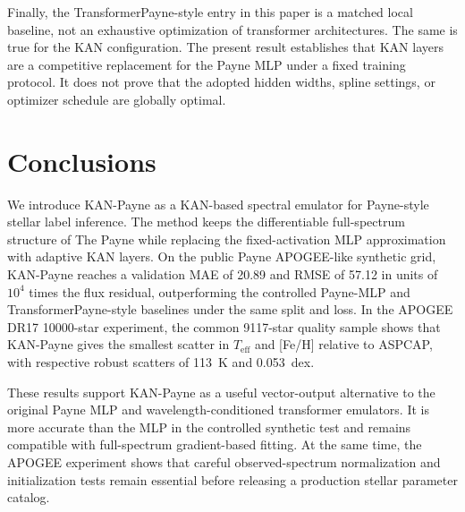 \documentclass[universe,article,submit,pdftex,moreauthors]{Definitions/mdpi}
\begin{document}
Finally, the TransformerPayne-style entry in this paper is a matched local baseline,
not an exhaustive optimization of transformer architectures. The same is true
for the KAN configuration. The present result establishes that KAN layers are a
competitive replacement for the Payne MLP under a fixed training protocol. It
does not prove that the adopted hidden widths, spline settings, or optimizer
schedule are globally optimal.

\section{Conclusions}

We introduce KAN-Payne as a KAN-based spectral emulator for Payne-style stellar
label inference. The method keeps the differentiable full-spectrum structure of
The Payne while replacing the fixed-activation MLP approximation with adaptive
KAN layers. On the public Payne APOGEE-like synthetic grid, KAN-Payne reaches
a validation MAE of 20.89 and RMSE of 57.12 in units of $10^4$ times the flux
residual, outperforming the controlled Payne-MLP and TransformerPayne-style
baselines under the same split and loss. In the APOGEE DR17 10000-star
experiment, the common 9117-star quality sample shows that KAN-Payne gives the
smallest scatter in $T_{\mathrm{eff}}$ and [Fe/H] relative to ASPCAP, with
respective robust scatters of 113~K and 0.053~dex.

These results support KAN-Payne as a useful vector-output alternative to the
original Payne MLP and wavelength-conditioned transformer emulators. It is more
accurate than the MLP in the controlled synthetic test and remains compatible
with full-spectrum gradient-based fitting. At the same time, the APOGEE
experiment shows that careful observed-spectrum normalization and initialization
tests remain essential before releasing a production stellar parameter catalog.


\end{document}
